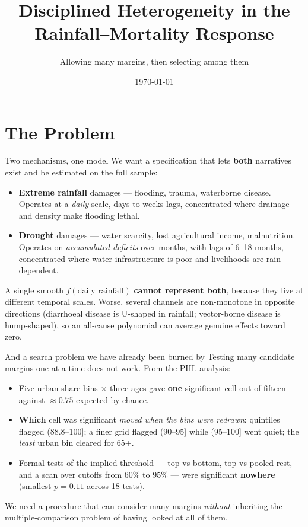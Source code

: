 \documentclass[10pt, aspectratio=169]{beamer}
\title{Disciplined Heterogeneity in the Rainfall--Mortality Response}
\subtitle{Allowing many margins, then selecting among them}
\date{\today}
\begin{document}
\begin{frame}[plain]\titlepage\end{frame}

\section{The Problem}

\begin{frame}{Two mechanisms, one model}
  We want a specification that lets \textbf{both} narratives exist and be
  estimated on the full sample:
  \begin{itemize}
    \item \textbf{Extreme rainfall} damages --- flooding, trauma, waterborne
          disease. Operates at a \emph{daily} scale, days-to-weeks lags,
          concentrated where drainage and density make flooding lethal.
    \item \textbf{Drought} damages --- water scarcity, lost agricultural
          income, malnutrition. Operates on \emph{accumulated deficits} over
          months, with lags of 6--18 months, concentrated where water
          infrastructure is poor and livelihoods are rain-dependent.
  \end{itemize}
  \vspace{0.5em}
  A single smooth $f(\text{daily rainfall})$ \textbf{cannot represent both},
  because they live at different temporal scales. Worse, several channels are
  non-monotone in opposite directions (diarrhoeal disease is U-shaped in
  rainfall; vector-borne disease is hump-shaped), so an all-cause polynomial
  can average genuine effects toward zero.
\end{frame}

\begin{frame}{And a search problem we have already been burned by}
  Testing many candidate margins one at a time does not work. From the PHL
  analysis:
  \begin{itemize}
    \item Five urban-share bins $\times$ three ages gave \textbf{one}
          significant cell out of fifteen --- against $\approx 0.75$ expected
          by chance.
    \item \textbf{Which} cell was significant \emph{moved when the bins were
          redrawn}: quintiles flagged (88.8--100]; a finer grid flagged
          (90--95] while (95--100] went quiet; the \emph{least} urban bin
          cleared for 65+.
    \item Formal tests of the implied threshold --- top-vs-bottom,
          top-vs-pooled-rest, and a scan over cutoffs from 60\% to 95\% ---
          were significant \textbf{nowhere} (smallest $p = 0.11$ across 18
          tests).
  \end{itemize}
  \vspace{0.4em}
  We need a procedure that can consider many margins \emph{without} inheriting
  the multiple-comparison problem of having looked at all of them.
\end{frame}
\end{document}
